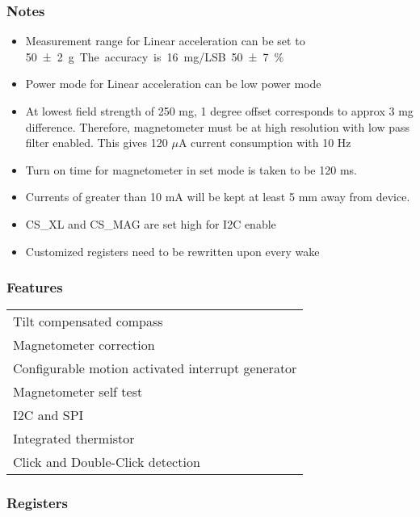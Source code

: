 \documentclass{article}
\begin{document}
\subsubsection{Notes}
\begin{itemize}
    \item Measurement range for Linear acceleration can be set to \SI{50 \pm 2} g. The accuracy is 16 mg/LSB \SI{50 \pm 7}{\percent}
    \item Power mode for Linear acceleration can be low power mode
    \item At lowest field strength of 250 mg, 1 degree offset corresponds to approx 3 mg difference. Therefore, magnetometer must be at high resolution with low pass filter enabled. This gives 120 $\mu$A current consumption with 10 Hz 
    \item Turn on time for magnetometer in set mode is taken to be 120 ms.
    \item Currents of greater than 10 mA will be kept at least 5 mm away from device.
    \item CS\_XL and CS\_MAG are set high for I2C enable
    \item Customized registers need to be rewritten upon every wake
\end{itemize}


\subsubsection{Features}
\begin{tabular}{l}
    Tilt compensated compass\\
    Magnetometer correction\\
    Configurable motion activated interrupt generator\\
    Magnetometer self test\\
    I2C and SPI\\
    Integrated thermistor\\
    Click and Double-Click detection\\
\end{tabular}





\subsubsection{Registers}
\end{document}
